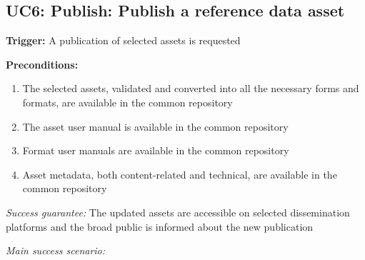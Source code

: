 	\subsection{UC6: Publish: Publish a reference data asset}
	\label{sec:uc6}		
	
	\textbf{Trigger:} A publication of selected assets is requested
	
	\textbf{Preconditions:} 
	\begin{enumerate}
		\item The selected assets, validated and converted into all the necessary forms and formats, are available in the common repository
		\item The asset user manual is available in the common repository
		\item Format user manuals are available in the common repository
		\item Asset metadata, both content-related and technical, are available in the common repository
	\end{enumerate}

	\textit{Success guarantee:} The updated assets are accessible on selected dissemination platforms and the broad public is informed about the new publication

	\textit{Main success scenario:} 
	
